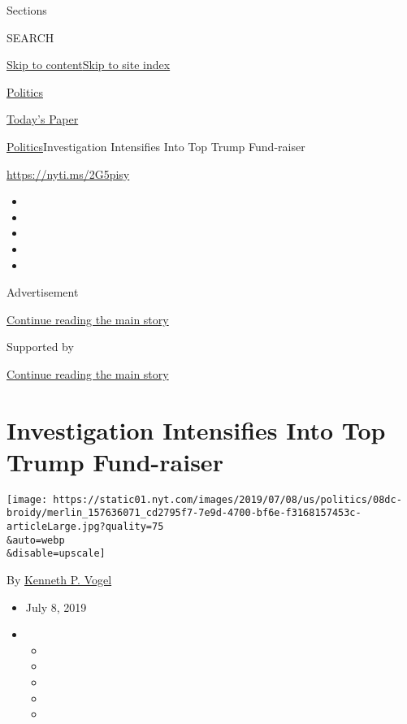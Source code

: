 Sections

SEARCH

\protect\hyperlink{site-content}{Skip to
content}\protect\hyperlink{site-index}{Skip to site index}

\href{https://www.nytimes.com/section/politics}{Politics}

\href{https://myaccount.nytimes.com/auth/login?response_type=cookie\&client_id=vi}{}

\href{https://www.nytimes.com/section/todayspaper}{Today's Paper}

\href{/section/politics}{Politics}\textbar{}Investigation Intensifies
Into Top Trump Fund-raiser

\url{https://nyti.ms/2G5pisy}

\begin{itemize}
\item
\item
\item
\item
\item
\end{itemize}

Advertisement

\protect\hyperlink{after-top}{Continue reading the main story}

Supported by

\protect\hyperlink{after-sponsor}{Continue reading the main story}

\hypertarget{investigation-intensifies-into-top-trump-fund-raiser}{%
\section{Investigation Intensifies Into Top Trump
Fund-raiser}\label{investigation-intensifies-into-top-trump-fund-raiser}}

\texttt{[image: https://static01.nyt.com/images/2019/07/08/us/politics/08dc-broidy/merlin\_157636071\_cd2795f7-7e9d-4700-bf6e-f3168157453c-articleLarge.jpg?quality=75\\\&auto=webp\\\&disable=upscale]}

By \href{https://www.nytimes.com/by/kenneth-p-vogel}{Kenneth P. Vogel}

\begin{itemize}
\item
  July 8, 2019
\item
  \begin{itemize}
  \item
  \item
  \item
  \item
  \item
  \end{itemize}
\end{itemize}

